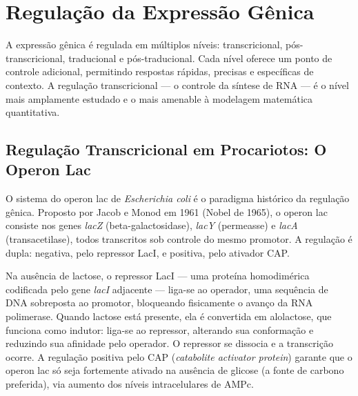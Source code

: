 \section{Regulação da Expressão Gênica}

A expressão gênica é regulada em múltiplos níveis: transcricional, pós-transcricional,
traducional e pós-traducional. Cada nível oferece um ponto de controle adicional, permitindo
respostas rápidas, precisas e específicas de contexto. A regulação transcricional --- o
controle da síntese de RNA --- é o nível mais amplamente estudado e o mais amenable à
modelagem matemática quantitativa.

\subsection{Regulação Transcricional em Procariotos: O Operon Lac}

O sistema do operon lac de \textit{Escherichia coli} é o paradigma histórico da regulação
gênica. Proposto por Jacob e Monod em 1961 (Nobel de 1965), o operon lac consiste nos
genes \textit{lacZ} (beta-galactosidase), \textit{lacY} (permeasse) e \textit{lacA}
(transacetilase), todos transcritos sob controle do mesmo promotor. A regulação é dupla:
negativa, pelo repressor LacI, e positiva, pelo ativador CAP.

Na ausência de lactose, o repressor LacI --- uma proteína homodimérica codificada pelo
gene \textit{lacI} adjacente --- liga-se ao operador, uma sequência de DNA sobreposta ao
promotor, bloqueando fisicamente o avanço da RNA polimerase. Quando lactose está presente,
ela é convertida em alolactose, que funciona como indutor: liga-se ao repressor, alterando
sua conformação e reduzindo sua afinidade pelo operador. O repressor se dissocia e a
transcrição ocorre. A regulação positiva pelo CAP (\textit{catabolite activator protein})
garante que o operon lac só seja fortemente ativado na ausência de glicose (a fonte de
carbono preferida), via aumento dos níveis intracelulares de AMPc.


